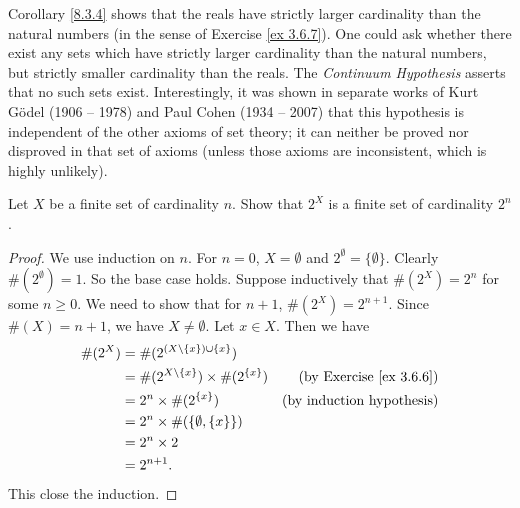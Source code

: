 \setcounter{theorem}{5}
\begin{remark}\label{8.3.6}
    Corollary \ref{8.3.4} shows that the reals have strictly larger cardinality than the natural numbers (in the sense of Exercise \ref{ex 3.6.7}).
    One could ask whether there exist any sets which have strictly larger cardinality than the natural numbers, but strictly smaller cardinality than the reals.
    The \emph{Continuum Hypothesis} asserts that no such sets exist.
    Interestingly, it was shown in separate works of Kurt Gödel (1906 -- 1978) and Paul Cohen (1934 -- 2007) that this hypothesis is independent of the other axioms of set theory;
    it can neither be proved nor disproved in that set of axioms
    (unless those axioms are inconsistent, which is highly unlikely).
\end{remark}

\exercisesection

\begin{exercise}\label{ex 8.3.1}
    Let \(X\) be a finite set of cardinality \(n\).
    Show that \(2^X\) is a finite set of cardinality \(2^n\).
\end{exercise}

\begin{proof}
    We use induction on \(n\).
    For \(n = 0\), \(X = \emptyset\) and \(2^{\emptyset} = \{\emptyset\}\).
    Clearly \(\#(2^{\emptyset}) = 1\).
    So the base case holds.
    Suppose inductively that \(\#(2^X) = 2^n\) for some \(n \geq 0\).
    We need to show that for \(n + 1\), \(\#(2^X) = 2^{n + 1}\).
    Since \(\#(X) = n + 1\), we have \(X \neq \emptyset\).
    Let \(x \in X\).
    Then we have
    \begin{align*}
        \#(2^X) & = \#(2^{(X \setminus \{x\}) \cup \{x\}})                                               \\
                & = \#(2^{X \setminus \{x\}}) \times \#(2^{\{x\}}) & \text{(by Exercise \ref{ex 3.6.6})} \\
                & = 2^n \times \#(2^{\{x\}})                       & \text{(by induction hypothesis)}    \\
                & = 2^n \times \#(\{\emptyset, \{x\}\})                                                  \\
                & = 2^n \times 2                                                                         \\
                & = 2^{n + 1}.
    \end{align*}
    This close the induction.
\end{proof}

